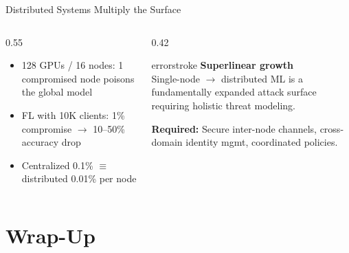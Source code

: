 \documentclass[aspectratio=169, 12pt]{beamer}
\begin{document}
\begin{frame}{Distributed Systems Multiply the Surface}
\begin{columns}[T]
\begin{column}{0.55\textwidth}
    \vspace{0.15cm}
    \begin{itemize}\setlength\itemsep{1pt}
      \item {\footnotesize 128 GPUs / 16 nodes: 1 compromised node poisons the global model}
      \item {\footnotesize FL with 10K clients: 1\% compromise $\to$ 10--50\% accuracy drop}
      \item {\footnotesize Centralized 0.1\% $\equiv$ distributed 0.01\% per node}
    \end{itemize}
  \end{column}
  \begin{column}{0.42\textwidth}
    \vspace{0.1cm}
    \begin{mlsyscard}{errorstroke}
    \textbf{Superlinear growth}\\[0.05cm]
    {\scriptsize Single-node $\to$ distributed ML is a fundamentally expanded attack surface requiring holistic threat modeling.}
    \end{mlsyscard}

    \vspace{0.1cm}
    {\scriptsize\textbf{Required:} Secure inter-node channels, cross-domain identity mgmt, coordinated policies.}
  \end{column}
\end{columns}

\end{frame}

\section{Wrap-Up}
\end{document}
